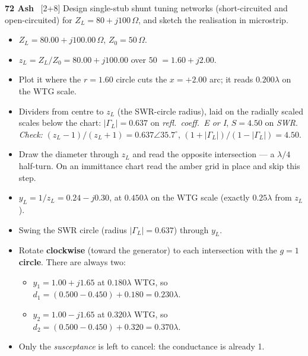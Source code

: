 \begin{asked}{\textbf{72 Ash} \ [2+8]}
Design single-stub shunt tuning networks (short-circuited and open-circuited) for $Z_L = 80+j100\,\Omega$, and sketch the realisation in microstrip.
\end{asked}
\begin{itemize}
  \item $Z_L = 80.00 + j100.00\,\Omega$, $Z_0 = 50\,\Omega$.
\end{itemize}
\begin{itemize}
  \item $z_L = Z_L/Z_0 = 80.00 + j100.00$ over $50$ $=1.60 + j2.00$.
  \item Plot it where the $r = 1.60$ circle cuts the $x = +2.00$ arc; it reads $0.200\lambda$ on the WTG scale.
  \item Dividers from centre to $z_L$ (the SWR-circle radius), laid on the radially scaled scales below the chart: $|\Gamma_L| = 0.637$ on \emph{refl.\ coeff.\ E or I}, $S = 4.50$ on \emph{SWR}. \textit{Check:} $(z_L-1)/(z_L+1) = 0.637\angle 35.7^\circ$, $(1+|\Gamma_L|)/(1-|\Gamma_L|) = 4.50$.
\end{itemize}
\begin{itemize}
  \item Draw the diameter through $z_L$ and read the opposite intersection --- a $\lambda/4$ half-turn. On an immittance chart read the amber grid in place and skip this step.
  \item $y_L = 1/z_L = 0.24 - j0.30$, at $0.450\lambda$ on the WTG scale (exactly $0.25\lambda$ from $z_L$).
\end{itemize}
\begin{itemize}
  \item Swing the SWR circle (radius $|\Gamma_L| = 0.637$) through $y_L$.
  \item Rotate \textbf{clockwise} (toward the generator) to each intersection with the \textbf{$g=1$ circle}. There are always two:
  \begin{itemize}
    \item $y_1 = 1.00 + j1.65$ at $0.180\lambda$ WTG, so $d_1 = (0.500 - 0.450) + 0.180 = 0.230\lambda$.
    \item $y_2 = 1.00 - j1.65$ at $0.320\lambda$ WTG, so $d_2 = (0.500 - 0.450) + 0.320 = 0.370\lambda$.
  \end{itemize}
  \item Only the \emph{susceptance} is left to cancel: the conductance is already 1.
\end{itemize}
